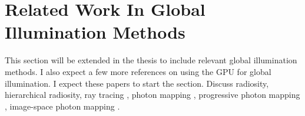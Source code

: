 \begin{comment}
\end{comment}

\section{Related Work In Global Illumination Methods}
This section will be extended in the thesis to include relevant global illumination methods.  I also expect a few more references on using the GPU for global illumination.  I expect these papers to start the section.
Discuss radiosity\cite{Goral:1984:MIL:800031.808601}, hierarchical radiosity\cite{Hanrahan:1991:RHR:127719.122740}, ray tracing \cite{Whitted:1980:IIM:358876.358882, Cook:1984:DRT:964965.808590}, photon mapping \cite{Jensen:1996:GIU:275458.275461}, progressive photon mapping \cite{Hachisuka:2008:PPM:1457515.1409083}, image-space photon mapping \cite{McGuire:2009:HGI:1572769.1572783}.
